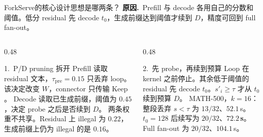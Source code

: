 \documentclass[aspectratio=169,10pt]{ctexbeamer}
\newcommand{\paperfig}[2][0.68]{%
  \begin{adjustbox}{max width=0.98\textwidth,max height=#1\textheight,center}
  \end{adjustbox}}
\newcommand{\sys}{\textsf{ForkServe}}
\newcommand{\good}[1]{\textcolor{fsgain}{\textbf{#1}}}
\newcommand{\bad}[1]{\textcolor{fsred}{#1}}
\newcommand{\src}[1]{\vspace{0.3em}{\scriptsize\color{fsgray}#1\par}}
\newcommand{\why}[1]{{\small\textbf{\color{fsgreen}原因.}\ #1}\par\vspace{0.45em}}
\begin{document}
\begin{frame}{\sys 的核心设计思想是哪两条？}
  \why{Prefill 与 decode 各用自己的分数和阈值。低分 residual 先 decode $t_0$，生成前缀达到阈值才续到 $D$，精度可回到 full fan-out。}
  \begin{columns}[T]
    \begin{column}{0.48\textwidth}
      \begin{block}{1.\ P/D pruning 拆开}
        \footnotesize
        Prefill 读取 residual 文本，$\tau_{\mathrm{pre}}{=}0.15$ 只丢弃 loop。该决定改变 $W$，connector 只传输 $\mathrm{Keep}$。
        Decode 读取已生成前缀，阈值为 $0.45$，决定 probe 之后是否续到 $D$。
        两条权重不共享。Residual 上 illegal 为 $0.22$，生成前缀上仍为 illegal 的是 $0.16$。
      \end{block}
    \end{column}
    \begin{column}{0.48\textwidth}
      \begin{block}{2.\ 先 probe，再续到预算}
        \footnotesize
        Loop 在 kernel 之前停止。其余低于阈值的 residual 先 decode $t_0$。$s'_i\ge\tau$ 才从 $t_0$ 续到预算 $D$。
        MATH-500，$k{=}16$：整段丢弃 $s{<}\tau$ 为 \bad{$13/32$}、$52.1$\,s。
        $t_0{=}128$ 后续写为 \good{$20/32$}、\good{$72.2$\,s}。Full fan-out 为 $20/32$、$104.1$\,s。
      \end{block}
    \end{column}
  \end{columns}
\end{frame}

\end{document}

